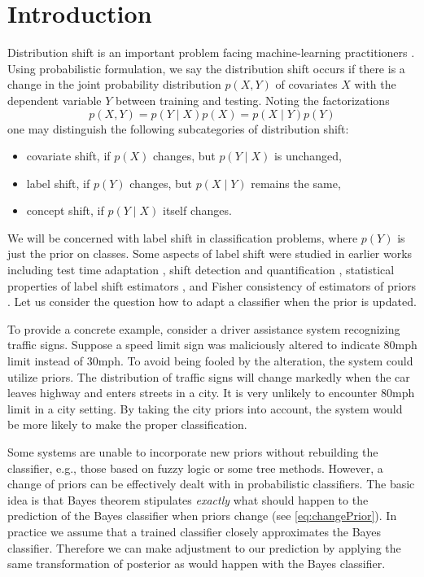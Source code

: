 \documentclass[pdflatex, sn-basic]{sn-jnl}%
\theoremstyle{thmstyleone}%
\theoremstyle{thmstyletwo}%
\theoremstyle{thmstylethree}%
\begin{document}
\section{Introduction}



Distribution shift is an important problem facing machine-learning practitioners 
\cite{zhang2023dive, sugiyama2007covariate}.  Using probabilistic formulation, we say the distribution shift occurs if there is a change  in the joint probability distribution $p(X,Y)$ of covariates $X$ with the dependent variable $Y$  between training and testing. Noting the factorizations 
$$
p(X,Y) = p(Y\mid X)p(X) = p(X \mid Y )p(Y)
$$
one may distinguish the following subcategories of distribution shift:
\begin{itemize}
	\item covariate shift, if $p(X)$ changes, but $p(Y\mid X)$ is unchanged,
	\item label shift, if $p(Y)$ changes, but $p(X \mid Y)$ remains the same,
	\item concept shift, if $p(Y \mid X)$ itself changes.
\end{itemize}

We will be concerned with label shift in classification problems, where $p(Y)$ 
is just the prior on classes.  Some aspects of label shift were studied in
earlier works including test time adaptation
\cite{vsipka2022hitchhiker}, shift detection and quantification 
\cite{lipton2018detecting}, 
statistical properties of label shift estimators \cite{garg2020unified}, 
and Fisher consistency of estimators of priors \cite{tasche2017fisher}. 
Let us consider  the question 
how to adapt a classifier when the  prior is updated.

To provide a concrete example, consider a driver assistance system recognizing traffic signs. 
Suppose a speed limit sign was maliciously altered to indicate 80mph limit instead of 30mph.
To avoid being fooled by the alteration, the system could utilize priors.
The distribution of traffic signs will change markedly when the car leaves highway and enters streets in a city.
It is very unlikely to encounter 80mph limit in a city setting. By taking 
the city priors  into account, the system would be more likely to make the proper classification. 

Some systems are unable to incorporate new priors without rebuilding 
the classifier, e.g., those based 
on fuzzy logic or some tree methods. 
However, a change of priors can be effectively dealt with in probabilistic 
classifiers. The basic idea is that Bayes theorem stipulates \emph{exactly} 
what should happen  to the prediction of the  Bayes classifier when priors 
change (see \eqref{eq:changePrior}).  In practice we assume that a trained 
classifier closely approximates the Bayes classifier. Therefore we can make 
adjustment to our prediction by applying the same transformation of posterior 
as would happen with the Bayes classifier. 
\end{document}
